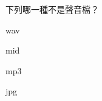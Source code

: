 \ifx\ntpcNinetyTwo\undefined[92學年基北區] \fi
下列哪一種不是聲音檔？
  \begin{optionlist}
  \item wav
  \item mid
  \item mp3
  \item jpg\label{ntpc-92-a20}
  \end{optionlist}